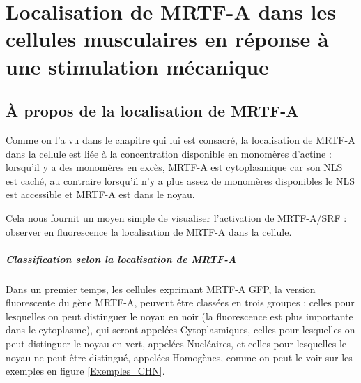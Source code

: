 \documentclass{report}
\begin{document}
\chapter{Localisation de MRTF-A dans les cellules musculaires en réponse à une stimulation mécanique}

\section{À propos de la localisation de MRTF-A}

 Comme on l'a vu dans le chapitre qui lui est consacré, la localisation de MRTF-A dans la cellule est liée à la concentration disponible en monomères d'actine : lorsqu'il y a des monomères en excès, MRTF-A est cytoplasmique car son NLS est caché, au contraire lorsqu'il n'y a plus assez de monomères disponibles le NLS est accessible et MRTF-A est dans le noyau. 
 
 Cela nous fournit un moyen simple de visualiser l'activation de MRTF-A/SRF : observer en fluorescence la localisation de MRTF-A dans la cellule. 
 
 \paragraph{Classification selon la localisation de MRTF-A}
 
 Dans un premier temps, les cellules exprimant MRTF-A GFP, la version fluorescente du gène MRTF-A, peuvent être classées en trois groupes : celles pour lesquelles on peut distinguer le noyau en noir (la fluorescence est plus importante dans le cytoplasme), qui seront appelées Cytoplasmiques, celles pour lesquelles on peut distinguer le noyau en vert, appelées Nucléaires, et celles pour lesquelles le noyau ne peut être distingué, appelées Homogènes, comme on peut le voir sur les exemples en figure  \ref{Exemples_CHN}.
 
\end{document}
